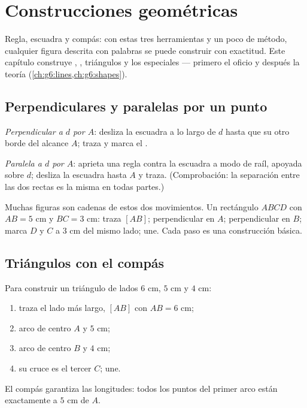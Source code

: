 \chapter{Construcciones geométricas}\label{ch:g5:geometry}

Regla, escuadra y compás: con estas tres herramientas y un poco de
método, cualquier figura descrita con palabras se puede construir con exactitud. Este
capítulo construye , , triángulos y los
 especiales --- primero el oficio y después la teoría
(\cref{ch:g6:lines,ch:g6:shapes}).

\section{Perpendiculares y paralelas por un punto}

\begin{method}\label{met:g5:geometry:basic}
\emph{Perpendicular a $d$ por $A$}: desliza la escuadra a lo largo de
$d$ hasta que su otro borde del  alcance $A$; traza y marca el
.

\emph{Paralela a $d$ por $A$}: aprieta una regla contra la escuadra
a modo de raíl, apoyada sobre $d$; desliza la escuadra hasta $A$ y
traza. (Comprobación: la separación entre las dos rectas es la misma
en todas partes.)
\end{method}

\begin{example}\label{ex:g5:geometry:chain}
Muchas figuras son cadenas de estos dos movimientos. Un rectángulo $ABCD$ con
$AB = 5$ cm y $BC = 3$ cm: traza $[AB]$; perpendicular en $A$;
perpendicular en $B$; marca $D$ y $C$ a $3$ cm del mismo lado;
une. Cada paso es una construcción básica.
\end{example}

\section{Triángulos con el compás}

\begin{method}\label{met:g5:geometry:triangle}
Para construir un triángulo de lados $6$ cm, $5$ cm y $4$ cm:
\begin{enumerate}
  \item traza el lado más largo, $[AB]$ con $AB = 6$ cm;
  \item arco de centro $A$ y  $5$ cm;
  \item arco de centro $B$ y  $4$ cm;
  \item su cruce es el tercer  $C$; une.
\end{enumerate}
El compás garantiza las longitudes: todos los puntos del primer arco están
exactamente a $5$ cm de $A$.
\end{method}

